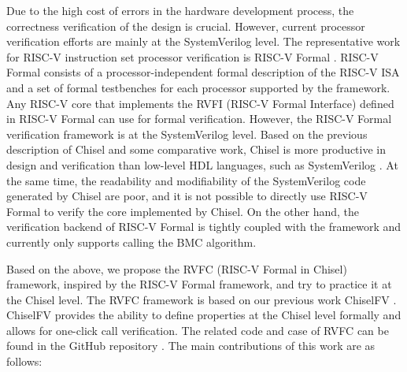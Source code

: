 \documentclass[conference]{IEEEtran}
\theoremstyle{definition}
\begin{document}
Due to the high cost of errors in the hardware development process, the correctness verification of the design is crucial.
However, current processor verification efforts are mainly at the SystemVerilog level.
The representative work for RISC-V instruction set processor verification is RISC-V Formal \cite{riscv-formal}.
RISC-V Formal consists of a processor-independent formal description of the RISC-V ISA and a set of formal testbenches for each processor supported by the framework.
Any RISC-V core that implements the RVFI (RISC-V Formal Interface) defined in RISC-V Formal can use for formal verification.
However, the RISC-V Formal verification framework is at the SystemVerilog level.
Based on the previous description of Chisel and some comparative work, Chisel is more productive in design and verification than low-level HDL languages, such as SystemVerilog \cite{im2021comparative}.
At the same time, the readability and modifiability of the SystemVerilog code generated by Chisel are poor, and it is not possible to directly use RISC-V Formal to verify the core implemented by Chisel.
On the other hand, the verification backend of RISC-V Formal is tightly coupled with the framework and currently only supports calling the BMC algorithm.

Based on the above, we propose the RVFC (RISC-V Formal in Chisel) framework, inspired by the RISC-V Formal framework, and try to practice it at the Chisel level. 
The RVFC framework is based on our previous work ChiselFV \cite{ChiselFV}.
ChiselFV provides the ability to define properties at the Chisel level formally and allows for one-click call verification.
The related code and case of RVFC can be found in the GitHub repository \cite{riscvFvChisel}.
The main contributions of this work are as follows:
\end{document}

